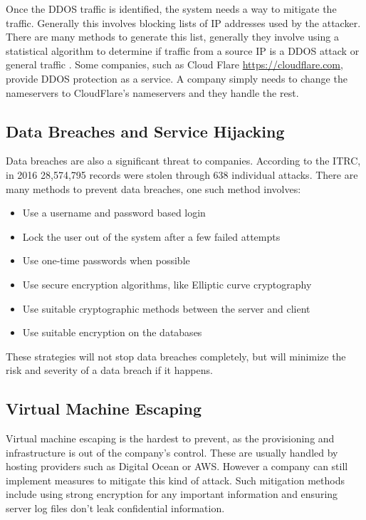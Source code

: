 Once the DDOS traffic is identified, the system needs a way to mitigate the traffic. Generally this involves blocking lists of IP addresses used by the attacker. There are many methods to generate this list, generally they involve using a statistical algorithm to determine if traffic from a source IP is a DDOS attack or general traffic \cite{yu_can_2014}. 
Some companies, such as Cloud Flare \url{https://cloudflare.com}, provide DDOS protection as a service. A company simply needs to change the nameservers to CloudFlare's nameservers and they handle the rest.

\subsection{Data Breaches and Service Hijacking}

Data breaches are also a significant threat to companies. According to the ITRC, in 2016 28,574,795 records were stolen through 638 individual attacks\cite{barney_2016_2016}.
There are many methods to prevent data breaches, one such method\cite{doe_secure_2014} involves:

\begin{itemize}
    \item Use a username and password based login
    \item Lock the user out of the system after a few failed attempts
    \item Use one-time passwords when possible
    \item Use secure encryption algorithms, like Elliptic curve cryptography\cite{rahulamathavan_assessing_2015}
    \item Use suitable cryptographic methods between the server and client
    \item Use suitable encryption on the databases
\end{itemize}

These strategies will not stop data breaches completely, but will minimize the risk and severity of a data breach if it happens.

\subsection{Virtual Machine Escaping}

Virtual machine escaping is the hardest to prevent, as the provisioning and infrastructure is out of the company's control. These are usually handled by hosting providers such as Digital Ocean or AWS.
However a company can still implement measures to mitigate this kind of attack. Such mitigation methods include using strong encryption for any important information and ensuring server log files don't leak confidential information\cite{witti_security_2016}.

